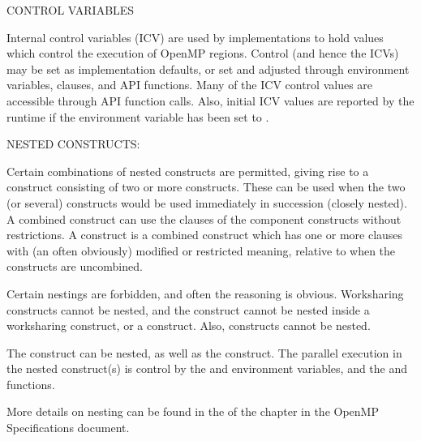 CONTROL VARIABLES 

  Internal control variables (ICV) are used by implementations to hold values which control the execution
  of OpenMP regions.  Control (and hence the ICVs) may be set as implementation defaults, 
  or set and adjusted through environment variables, clauses, and API functions.  Many of the ICV control
  values are accessible through API function calls.  Also, initial ICV values are reported by the runtime
  if the  environment variable has been set to . 


NESTED CONSTRUCTS:

Certain combinations of nested constructs are permitted, giving rise to a  construct
consisting of two or more constructs.  These can be used when the two (or several) constructs would be used
immediately in succession (closely nested). A combined construct can use the clauses of the component
constructs without restrictions.
A  construct is a combined construct which has one or more clauses with (an often obviously)
modified or restricted meaning, relative to when the constructs are uncombined. %


Certain nestings are forbidden, and often the reasoning is obvious.  Worksharing constructs cannot be nested, and
the  construct cannot be nested inside a worksharing construct, or a  construct. 
Also,  constructs cannot be nested.  

The  construct can be nested, as well as the  construct.  The parallel
execution in the nested  construct(s) is control by the  and 
 environment variables, and the  and 
 functions.

More details on nesting can be found in the  of the  
chapter in the OpenMP Specifications document.
